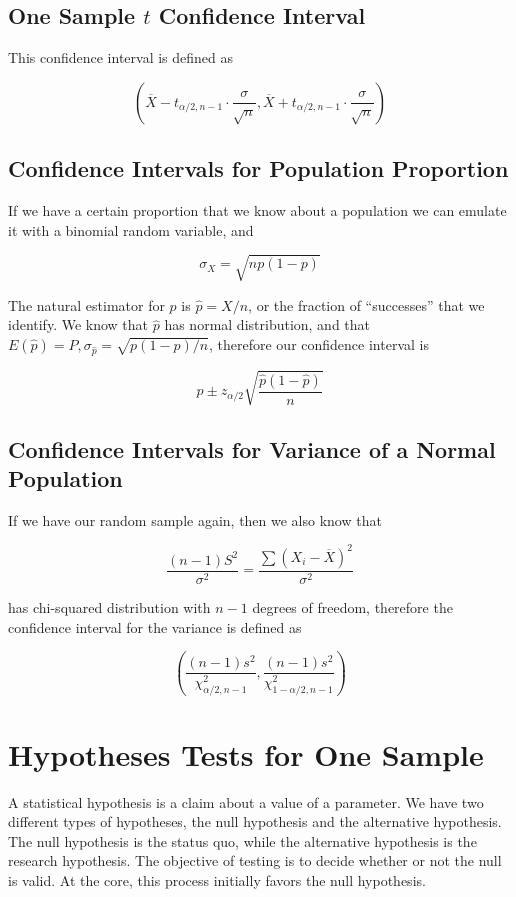     \subsection{One Sample $t$ Confidence Interval}
    This confidence interval is defined as

    \[
        \left(
        \overline{X} - t_{\alpha/2, n - 1} \cdot \frac{\sigma}{\sqrt{n}},
        \overline{X} + t_{\alpha/2, n - 1} \cdot \frac{\sigma}{\sqrt{n}}
        \right)
    \]

    \subsection{Confidence Intervals for Population Proportion}
    If we have a certain proportion that we know about a population we can emulate it with a binomial random variable,
    and

    \[
        \sigma_X = \sqrt{np ( 1 - p)}
    \]

    The natural estimator for $p$ is $\hat{p} = X / n$, or the fraction of ``successes'' that we identify. We know that
    $\hat{p}$ has normal distribution, and that $E(\hat{p}) = P, \sigma_{\hat{p}} = \sqrt{p (1 - p) / n}$, therefore our
    confidence interval is

    \[
        \hat{p} \pm z_{\alpha/2} \sqrt{\frac{\hat{p}(1 - \hat{p})}{n}}
    \]

    \subsection{Confidence Intervals for Variance of a Normal Population}
    If we have our random sample again, then we also know that

    \[
        \frac{(n - 1) S^2}{\sigma^2} = \frac{\sum {\left( X_i - \overline{X} \right)}^2}{\sigma^2}
    \]

    has chi-squared distribution with $n - 1$ degrees of freedom, therefore the confidence interval for the variance is
    defined as

    \[
        \left(
        \frac{(n - 1)s^2}{\chi^2_{\alpha/2, n - 1}},
        \frac{(n - 1)s^2}{\chi^2_{1 - \alpha/2, n - 1}}
        \right)
    \]

\section{Hypotheses Tests for One Sample}
A statistical hypothesis is a claim about a value of a parameter. We have two different types of hypotheses, the null
hypothesis and the alternative hypothesis. The null hypothesis is the status quo, while the alternative hypothesis is
the research hypothesis. The objective of testing is to decide whether or not the null is valid. At the core, this
process initially favors the null hypothesis.


